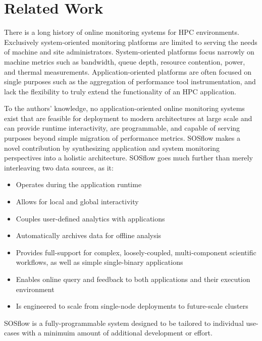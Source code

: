 
\section{Related Work}
%
There is a long history of online monitoring systems for HPC environments.
%
Exclusively system-oriented monitoring platforms are limited to serving the
needs of machine and site administrators.
%
System-oriented platforms focus narrowly on machine metrics such as bandwidth,
queue depth, resource contention, power, and thermal measurements.
%
Application-oriented platforms are often focused on single purposes such as
the aggregation of performance tool instrumentation, and lack the flexibility
to truly extend the functionality of an HPC application.
%
%
\par
%
%
%
\par
%
To the authors' knowledge, no application-oriented online monitoring systems
exist that are feasible for deployment to modern architectures at large scale
and can provide runtime interactivity, are programmable, and capable of
serving purposes beyond simple migration of performance metrics.
%
SOSflow makes a novel contribution by synthesizing application and system
monitoring perspectives into a holistic architecture.
%
SOSflow goes much further than merely interleaving two data sources, as it:
%
\begin{itemize}
    \item Operates during the application runtime
    \item Allows for local and global interactivity
    \item Couples user-defined analytics with applications
    \item Automatically archives data for offline analysis
    \item Provides full-support for complex, loosely-coupled,
        multi-component scientific workflows, as well as simple
        single-binary applications        
    \item Enables online query and feedback to both applications
        and their execution environment
    \item Is engineered to scale from single-node deployments
        to future-scale clusters
\end{itemize}
%
SOSflow is a fully-programmable system designed to be tailored to individual
use-cases with a minimuim amount of additional development or effort.
%
